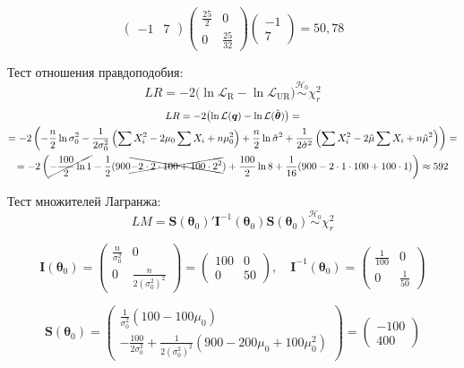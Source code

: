 \documentclass[pdftex,11pt,openany]{book}\usepackage[]{graphicx}\usepackage[]{color}
\newcommand{\calL}{\mathcal{L}}
\newcommand{\bs}[1]{\boldsymbol{#1}}
\newcommand{\hypo}{\mathcal{H}}
\newcommand{\simhypo}{\ensuremath{\mathrel{\stackrel{\hypo_0}{\sim}}}}
\begin{document}
\begin{solution}
\[\begin{pmatrix} -1 & 7 \end{pmatrix} \begin{pmatrix} \frac{25}{2} & 0 \\ 0 & \frac{25}{32} \end{pmatrix} \begin{pmatrix} -1  \\  7 \end{pmatrix} = 50{,}78
\]

Тест отношения правдоподобия:
\[
LR = -2 \bigl( \ln \calL_{\text{R}} - \ln \calL_{\text{UR}} \bigr) \simhypo \chi^2_r
\]
\begin{multline*}
LR =  -2 \bigl( \ln \calL(\bs{q}) - \ln \calL(\hat{\bs\theta}) \bigr) = \\
 = -2 \left( -\frac{n}{2} \ln \sigma^2_0 - \frac{1}{2\sigma^2_0} \left( \sum X_i^2 - 2\mu_0 \sum X_i + n \mu^2_0\right) + \frac{n}{2} \ln \hat\sigma^2 + \frac{1}{2\hat\sigma^2} \left( \sum X_i^2 - 2\hat\mu \sum X_i + n \hat\mu^2\right) \right) = \\
= -2 \left( \cancel{- \frac{100}{2} \ln 1} - \frac{1}{2} ( 900 \xcancel{- 2\cdot 2 \cdot 100 + 100\cdot 2^2}) +  \frac{100}{2} \ln 8 + \frac{1}{16} ( 900 - 2\cdot 1 \cdot 100 + 100\cdot 1)  \right) \approx 592
\end{multline*}

Тест множителей Лагранжа:
\[
LM = \bs{S}(\bs{\theta}_0)' \bs{I}^{-1}(\bs{\theta}_{0}) \bs{S}(\bs{\theta}_{0}) \simhypo \chi^2_r
\]

\[
\bs{I}(\bs\theta_0) = \begin{pmatrix}  \frac{n}{\sigma^2_0} & 0 \\ 0  & \frac{n}{2(\sigma^2_0)^2} \end{pmatrix} = \begin{pmatrix}  100 & 0 \\ 0  & 50 \end{pmatrix}, \quad \bs{I}^{-1}(\bs\theta_0) = \begin{pmatrix}  \frac{1}{100} & 0 \\ 0  & \frac{1}{50} \end{pmatrix}\]

\[\bs{S}(\bs\theta_0) =  \begin{pmatrix} \frac{1}{\sigma^2_0 } (100-100\mu_0) \\ -\frac{100}{2\sigma^2_0} + \frac{1}{2(\sigma_0^2)^2 } (900 - 200\mu_0 + 100\mu_0^2)  \end{pmatrix} = \begin{pmatrix} -100 \\ 400 \end{pmatrix}
\]



\end{solution}
\end{document}
